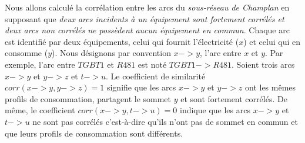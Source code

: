 \newline

Nous allons calcul\'e la corr\'elation entre les arcs du {\em sous-r\'eseau de Champlan} en supposant que {\em deux arcs incidents \`a un \'equipement sont fortement corr\'el\'es et deux arcs non corr\'el\'es ne poss\`edent aucun \'equipement en commun}.
Chaque arc est identifi\'e par deux \'equipements, celui qui fournit l'\'electricit\'e ($x$) et celui qui en consomme ($y$). Nous d\'esignons par convention $x->y$, l'arc entre $x$ et $y$. Par exemple, l'arc entre $TGBT1$ et $R481$ est not\'e $TGBT1->R481$. 
\newline
Soient trois arcs $x->y$ et $y->z$ et $t->u$. 
Le coefficient de similarit\'e $corr(x->y,y->z) = 1$ signifie que les arcs $x->y$ et $y->z$  ont les m\^emes profils de consommation, partagent le sommet $y$ et sont fortement corr\'el\'es. De m\^eme, le coefficient $corr(x->y,t->u) = 0$ indique que les arcs  $x->y$ et $t->u$ ne sont pas corr\'el\'es c'est-\`a-dire qu'ils n'ont pas de sommet en commun et que leurs profils de consommation sont diff\'erents.
\newline

